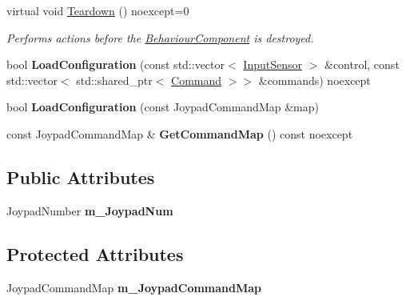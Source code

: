 \begin{DoxyCompactItemize}
virtual void \hyperlink{class_blade_1_1_joypad_input_component_ab5009626ea7dd18b3713b4e3ee8fa650}{Teardown} () noexcept=0
\begin{DoxyCompactList}\small\item\em Performs actions before the \hyperlink{class_blade_1_1_behaviour_component}{Behaviour\+Component} is destroyed. \end{DoxyCompactList}\item 
\mbox{\label{class_blade_1_1_joypad_input_component_aa72a4910f2db050a9d25051e1482b812}} 
bool {\bfseries Load\+Configuration} (const std\+::vector$<$ \hyperlink{namespace_blade_a1ecca198b7e0afbe43139ec2b0db937c}{Input\+Sensor} $>$ \&control, const std\+::vector$<$ std\+::shared\+\_\+ptr$<$ \hyperlink{class_blade_1_1_command}{Command} $>$$>$ \&commands) noexcept
\item 
\mbox{\label{class_blade_1_1_joypad_input_component_a1829016a46492b0e1387db96b5b1ceb0}} 
bool {\bfseries Load\+Configuration} (const Joypad\+Command\+Map \&map)
\item 
\mbox{\label{class_blade_1_1_joypad_input_component_a0835408ffdcf5f6fb44f726f053a7152}} 
const Joypad\+Command\+Map \& {\bfseries Get\+Command\+Map} () const noexcept
\end{DoxyCompactItemize}
\subsection*{Public Attributes}
\begin{DoxyCompactItemize}
\item 
\mbox{\label{class_blade_1_1_joypad_input_component_ad67873042be4c780de3d2257ba2bd88b}} 
Joypad\+Number {\bfseries m\+\_\+\+Joypad\+Num}
\end{DoxyCompactItemize}
\subsection*{Protected Attributes}
\begin{DoxyCompactItemize}
\item 
\mbox{\label{class_blade_1_1_joypad_input_component_a17ae33415867c4d3128cfa28f30e46d2}} 
Joypad\+Command\+Map {\bfseries m\+\_\+\+Joypad\+Command\+Map}
\end{DoxyCompactItemize}



